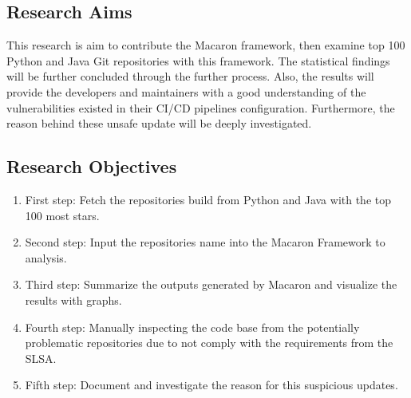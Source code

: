 \subsection{Research Aims}
This research is aim to contribute the Macaron framework, then examine top 100 Python and Java Git 
repositories with this framework. The statistical findings will be further concluded through the further process.
Also, the results will provide the developers and maintainers with a good understanding 
of the vulnerabilities existed in their CI/CD pipelines configuration. Furthermore, the reason behind
these unsafe update will be deeply investigated.

\subsection{Research Objectives}
\begin{enumerate}
    \item First step: Fetch the repositories build from Python and Java with the top 100 most stars.
    \item Second step: Input the repositories name into the Macaron Framework to analysis. 
    \item Third step: Summarize the outputs generated by Macaron and visualize the results with graphs.
    \item Fourth step: Manually inspecting the code base from the potentially problematic repositories 
    due to not comply with the requirements from the SLSA.
    \item Fifth step: Document and investigate the reason for this suspicious updates.  
\end{enumerate}
